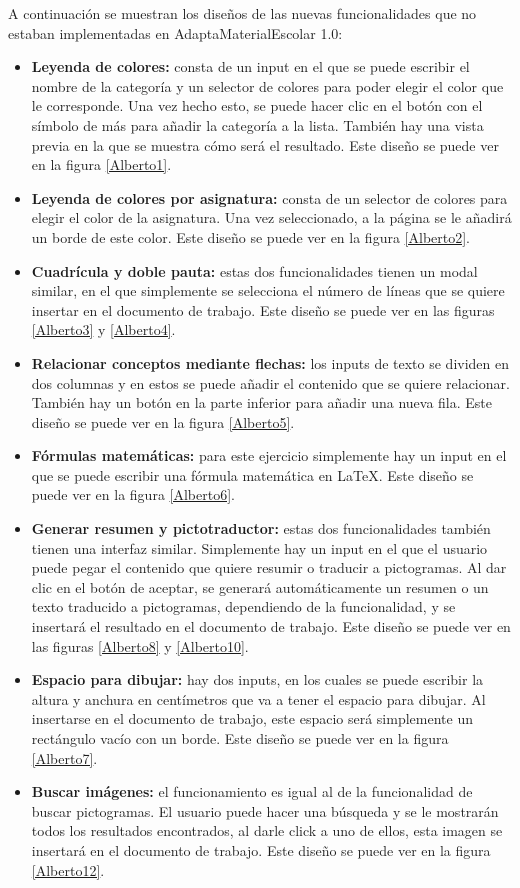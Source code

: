 A continuación se muestran los diseños de las nuevas funcionalidades que no estaban implementadas en AdaptaMaterialEscolar 1.0:

\begin{itemize}
  \item \textbf{Leyenda de colores:} consta de un input en el que se puede escribir el nombre de la categoría y un selector de colores para poder elegir el color que le corresponde. Una vez hecho esto, se puede hacer clic en el botón con el símbolo de más para añadir la categoría a la lista. También hay una vista previa en la que se muestra cómo será el resultado. Este diseño se puede ver en la figura \ref{Alberto1}.
  \item \textbf{Leyenda de colores por asignatura:} consta de un selector de colores para elegir el color de la asignatura. Una vez seleccionado, a la página se le añadirá un borde de este color. Este diseño se puede ver en la figura \ref{Alberto2}.
  \item \textbf{Cuadrícula y doble pauta:} estas dos funcionalidades tienen un modal similar, en el que simplemente se selecciona el número de líneas que se quiere insertar en el documento de trabajo. Este diseño se puede ver en las figuras \ref{Alberto3} y \ref{Alberto4}.
  \item \textbf{Relacionar conceptos mediante flechas:} los inputs de texto se dividen en dos columnas y en estos se puede añadir el contenido que se quiere relacionar. También hay un botón en la parte inferior para añadir una nueva fila. Este diseño se puede ver en la figura \ref{Alberto5}.
  \item \textbf{Fórmulas matemáticas:} para este ejercicio simplemente hay un input en el que se puede escribir una fórmula matemática en LaTeX. Este diseño se puede ver en la figura \ref{Alberto6}.
  \item \textbf{Generar resumen y pictotraductor:} estas dos funcionalidades también tienen una interfaz similar. Simplemente hay un input en el que el usuario puede pegar el contenido que quiere resumir o traducir a pictogramas. Al dar clic en el botón de aceptar, se generará automáticamente un resumen o un texto traducido a pictogramas, dependiendo de la funcionalidad, y se insertará el resultado en el documento de trabajo. Este diseño se puede ver en las figuras \ref{Alberto8} y \ref{Alberto10}.
  \item \textbf{Espacio para dibujar:} hay dos inputs, en los cuales se puede escribir la altura y anchura en centímetros que va a tener el espacio para dibujar. Al insertarse en el documento de trabajo, este espacio será simplemente un rectángulo vacío con un borde. Este diseño se puede ver en la figura \ref{Alberto7}.
  \item \textbf{Buscar imágenes:} el funcionamiento es igual al de la funcionalidad de buscar pictogramas. El usuario puede hacer una búsqueda y se le mostrarán todos los resultados encontrados, al darle click a uno de ellos, esta imagen se insertará en el documento de trabajo. Este diseño se puede ver en la figura \ref{Alberto12}.
\end{itemize}

